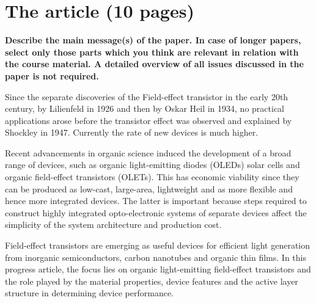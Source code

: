 \section{The article (10 pages)}
\textbf{Describe the main message(s) of the paper. In case of longer papers, select only those parts which you think are relevant in relation with the course material. A detailed overview of all issues discussed in the paper is not required.}

Since the separate discoveries of the Field-effect transistor in the early 20th century, by Lilienfeld in 1926 and then by Oskar Heil in 1934, no practical applications arose before the transistor effect was observed and explained by Shockley in 1947. Currently the rate of new devices is much higher.

Recent advancements in organic science induced the development of a broad range of devices, such as organic light-emitting diodes (OLEDs) solar cells and organic field-effect transistors (OLETs). This has economic viability since they can be produced as low-cast, large-area, lightweight and as more flexible and hence more integrated devices. The latter is important because steps required to construct highly integrated opto-electronic systems of separate devices affect the simplicity of the system architecture and production cost. 

Field-effect transistors are emerging as useful devices for efficient light generation from inorganic semiconductors, carbon nanotubes and organic thin films. In this progress article, the focus lies on organic light-emitting field-effect transistors and the role played by the material properties, device features and the active layer structure in determining device performance.

